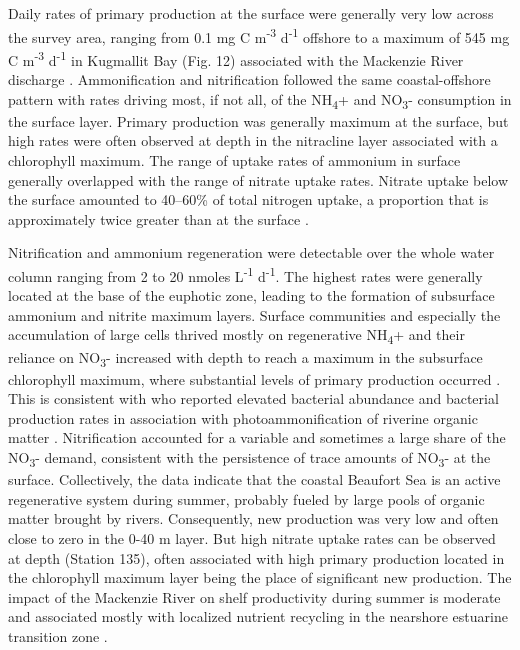 \documentclass[essd, manuscript]{copernicus}
\begin{document}
Daily rates of primary production at the surface were generally very low across the survey area, ranging from 0.1 mg C m\textsuperscript{-3} d\textsuperscript{-1} offshore to a maximum of 545 mg C m\textsuperscript{-3} d\textsuperscript{-1} in Kugmallit Bay (Fig. 12) associated with the Mackenzie River discharge \citep{Tremblay2014}. Ammonification and nitrification followed the same coastal-offshore pattern with rates driving most, if not all, of the NH\textsubscript{4}+ and NO\textsubscript{3}- consumption in the surface layer. Primary production was generally maximum at the surface, but high rates were often observed at depth in the nitracline layer associated with a chlorophyll maximum. The range of uptake rates of ammonium in surface generally overlapped with the range of nitrate uptake rates. Nitrate uptake below the surface amounted to 40–60\% of total nitrogen uptake, a proportion that is approximately twice greater than at the surface \citep{Ardyna2017}.

Nitrification and ammonium regeneration were detectable over the whole water column ranging from 2 to 20 nmoles L\textsuperscript{-1} d\textsuperscript{-1}. The highest rates were generally located at the base of the euphotic zone, leading to the formation of subsurface ammonium and nitrite maximum layers. Surface communities and especially the accumulation of large cells thrived mostly on regenerative NH\textsubscript{4}+ and their reliance on NO\textsubscript{3}- increased with depth to reach a maximum in the subsurface chlorophyll maximum, where substantial levels of primary production occurred \citep{Ardyna2017}. This is consistent with \citet{Ortega-Retuerta2012a} who reported elevated bacterial abundance and bacterial production rates in association with photoammonification of riverine organic matter \citep{LeFouest2013}. Nitrification accounted for a variable and sometimes a large share of the NO\textsubscript{3}- demand, consistent with the persistence of trace amounts of NO\textsubscript{3}- at the surface. Collectively, the data indicate that the coastal Beaufort Sea is an active regenerative system during summer, probably fueled by large pools of organic matter brought by rivers. Consequently, new production was very low and often close to zero in the 0-40 m layer. But high nitrate uptake rates can be observed at depth (Station 135), often associated with high primary production located in the chlorophyll maximum layer being the place of significant new production. The impact of the Mackenzie River on shelf productivity during summer is moderate and associated mostly with localized nutrient recycling in the nearshore estuarine transition zone \citep{Tremblay2014}.
\end{document}

